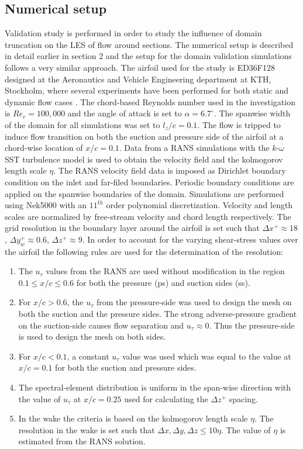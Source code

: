 
\subsection{Numerical setup}

Validation study is performed in order to study the influence of domain truncation on the LES of flow around sections. The numerical setup is described in detail earlier in section 2 and the setup for the domain validation simulations follows a very similar approach. The airfoil used for the study is ED36F128 designed at the Aeronautics and Vehicle Engineering department at KTH, Stockholm, where several experiments have been performed for both static \citep{lokatt17} and dynamic flow cases \citep{lokattthesis}. The chord-based Reynolds number used in the investigation is $Re_{c}=100,000$ and the angle of attack is set to $\alpha=6.7^{\circ}$. The spanwise width of the domain for all simulations was set to $l_{z}/c=0.1$. The flow is tripped to induce flow transition on both the suction and pressure side of the airfoil at a chord-wise location of $x/c=0.1$. Data from a RANS simulations with the $k$-$\omega$ SST turbulence model is used to obtain the velocity field and the kolmogorov length scale $\eta$. The RANS velocity field data is imposed as Dirichlet boundary condition on the inlet and far-filed boundaries. Periodic boundary conditions are applied on the spanwise boundaries of the domain. Simulations are performed using Nek5000 \citep{nek5000} with an $11^{th}$ order polynomial discretization. Velocity and length scales are normalized by free-stream velocity and chord length respectively. The grid resolution in the boundary layer around the airfoil is set such that $\Delta x^{+}\approx18$, $\Delta y_{w}^{+}\approx0.6$, $\Delta z^{+}\approx 9$. In order to account for the varying shear-stress values over the airfoil the following rules are used for the determination of the resolution:
\begin{enumerate}[topsep=5pt]
	\item The $u_{\tau}$ values from the RANS are used without modification in the region $0.1\le x/c\le0.6$ for both the pressure (ps) and suction sides (ss).
	\item For $x/c>0.6$, the $u_{\tau}$ from the pressure-side was used to design the mesh on both the suction and the pressure sides. The strong adverse-pressure gradient on the suction-side causes flow separation and $u_{\tau}\approx0$. Thus the pressure-side is used to design the mesh on both sides.
	\item For $x/c<0.1$, a constant $u_{\tau}$ value was used which was equal to the value at $x/c=0.1$ for both the suction and pressure sides.
	\item The spectral-element distribution is uniform in the span-wise direction with the value of $u_{\tau}$ at $x/c=0.25$ used for calculating the $\Delta z^{+}$ spacing.
	\item In the wake the criteria is based on the kolmogorov length scale $\eta$. The resolution in the wake is set such that $\Delta x,\Delta y,\Delta z\le10\eta$. The value of $\eta$ is estimated from the RANS solution. 
\end{enumerate}


